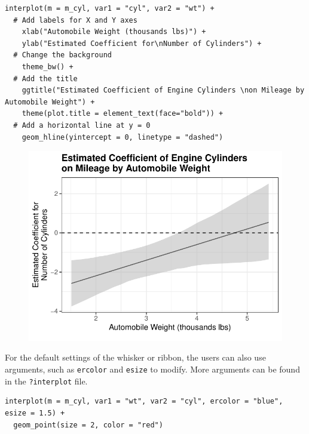 \documentclass[
  article]{jss}
\begin{document}
\begin{verbatim}
interplot(m = m_cyl, var1 = "cyl", var2 = "wt") + 
  # Add labels for X and Y axes
    xlab("Automobile Weight (thousands lbs)") +
    ylab("Estimated Coefficient for\nNumber of Cylinders") +
  # Change the background
    theme_bw() +
  # Add the title
    ggtitle("Estimated Coefficient of Engine Cylinders \non Mileage by Automobile Weight") +
    theme(plot.title = element_text(face="bold")) +
  # Add a horizontal line at y = 0
    geom_hline(yintercept = 0, linetype = "dashed")
\end{verbatim}

\begin{figure}[H]

{\centering \includegraphics{jss_manuscript_files/figure-pdf/unnamed-chunk-7-1.pdf}

}

\end{figure}

For the default settings of the whisker or ribbon, the users can also
use arguments, such as \texttt{ercolor} and \texttt{esize} to modify.
More arguments can be found in the \texttt{?interplot} file.

\begin{verbatim}
interplot(m = m_cyl, var1 = "wt", var2 = "cyl", ercolor = "blue", esize = 1.5) +
  geom_point(size = 2, color = "red")
\end{verbatim}
\end{document}
